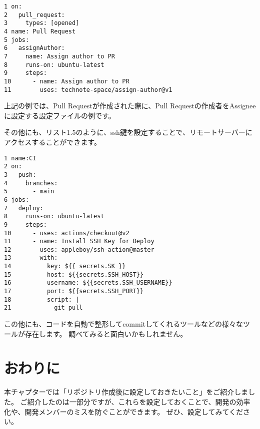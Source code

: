 \begin{tcolorbox}[title=リスト1.4 .github/workflows/pr.yml]
  \begin{verbatim}
1 on:
2   pull_request:
3     types: [opened]
4 name: Pull Request
5 jobs:
6   assignAuthor:
7     name: Assign author to PR
8     runs-on: ubuntu-latest
9     steps:
10      - name: Assign author to PR
11        uses: technote-space/assign-author@v1
\end{verbatim}
\end{tcolorbox}

上記の例では、Pull Requestが作成された際に、Pull Requestの作成者をAssigneeに設定する設定ファイルの例です。

その他にも、リスト1.5のように、ssh鍵を設定することで、リモートサーバーにアクセスすることができます。
\begin{tcolorbox}[title=リスト1.5 .github/workflows/deploy.yml]
  \begin{verbatim}
1 name:CI
2 on:
3   push:
4     branches:
5       - main
6 jobs:
7   deploy:
8     runs-on: ubuntu-latest
9     steps:
10      - uses: actions/checkout@v2
11      - name: Install SSH Key for Deploy
12        uses: appleboy/ssh-action@master
13        with:
14          key: ${{ secrets.SK }}
15          host: ${{secrets.SSH_HOST}}
16          username: ${{secrets.SSH_USERNAME}}
17          port: ${{secrets.SSH_PORT}}
18          script: |
21            git pull
\end{verbatim}
\end{tcolorbox}

この他にも、コードを自動で整形してcommitしてくれるツールなどの様々なツールが存在します。
調べてみると面白いかもしれません。

\section{おわりに}
本チャプターでは「リポジトリ作成後に設定しておきたいこと」をご紹介しました。
ご紹介したのは一部分ですが、これらを設定しておくことで、開発の効率化や、開発メンバーのミスを防ぐことができます。
ぜひ、設定してみてください。
